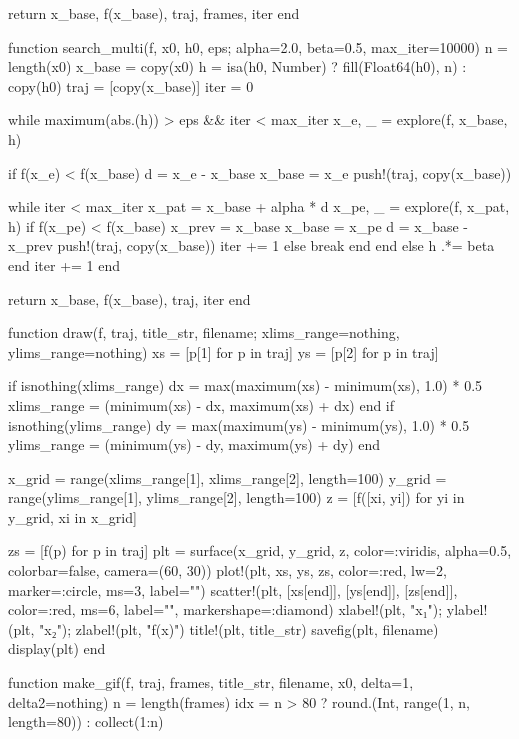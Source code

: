 \documentclass[a4paper, 14pt]{extarticle}
\begin{document}
\begin{breakablelisting}
    return x_base, f(x_base), traj, frames, iter
end

function search_multi(f, x0, h0, eps; alpha=2.0, beta=0.5, max_iter=10000)
    n = length(x0)
    x_base = copy(x0)
    h = isa(h0, Number) ? fill(Float64(h0), n) : copy(h0)
    traj = [copy(x_base)]
    iter = 0

    while maximum(abs.(h)) > eps && iter < max_iter
        x_e, _ = explore(f, x_base, h)

        if f(x_e) < f(x_base)
            d = x_e - x_base
            x_base = x_e
            push!(traj, copy(x_base))

            while iter < max_iter
                x_pat = x_base + alpha * d
                x_pe, _ = explore(f, x_pat, h)
                if f(x_pe) < f(x_base)
                    x_prev = x_base
                    x_base = x_pe
                    d = x_base - x_prev
                    push!(traj, copy(x_base))
                    iter += 1
                else
                    break
                end
            end
        else
            h .*= beta
        end
        iter += 1
    end

    return x_base, f(x_base), traj, iter
end

function draw(f, traj, title_str, filename;
              xlims_range=nothing, ylims_range=nothing)
    xs = [p[1] for p in traj]
    ys = [p[2] for p in traj]

    if isnothing(xlims_range)
        dx = max(maximum(xs) - minimum(xs), 1.0) * 0.5
        xlims_range = (minimum(xs) - dx, maximum(xs) + dx)
    end
    if isnothing(ylims_range)
        dy = max(maximum(ys) - minimum(ys), 1.0) * 0.5
        ylims_range = (minimum(ys) - dy, maximum(ys) + dy)
    end

    x_grid = range(xlims_range[1], xlims_range[2], length=100)
    y_grid = range(ylims_range[1], ylims_range[2], length=100)
    z = [f([xi, yi]) for yi in y_grid, xi in x_grid]

    zs = [f(p) for p in traj]
    plt = surface(x_grid, y_grid, z, color=:viridis, alpha=0.5, colorbar=false, camera=(60, 30))
    plot!(plt, xs, ys, zs, color=:red, lw=2, marker=:circle, ms=3, label="")
    scatter!(plt, [xs[end]], [ys[end]], [zs[end]], color=:red, ms=6, label="", markershape=:diamond)
    xlabel!(plt, "x₁"); ylabel!(plt, "x₂"); zlabel!(plt, "f(x)")
    title!(plt, title_str)
    savefig(plt, filename)
    display(plt)
end

function make_gif(f, traj, frames, title_str, filename, x0, delta=1, delta2=nothing)
    n = length(frames)
    idx = n > 80 ? round.(Int, range(1, n, length=80)) : collect(1:n)


\end{breakablelisting}
\end{document}
